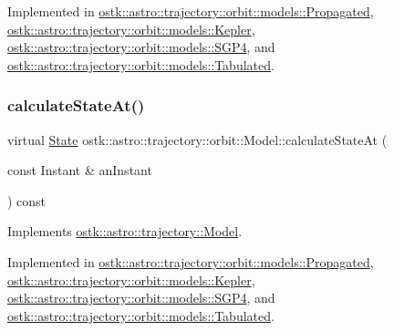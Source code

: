 Implemented in \hyperlink{classostk_1_1astro_1_1trajectory_1_1orbit_1_1models_1_1_propagated_a6360392c65494aa42aadff58ec58e49c}{ostk\+::astro\+::trajectory\+::orbit\+::models\+::\+Propagated}, \hyperlink{classostk_1_1astro_1_1trajectory_1_1orbit_1_1models_1_1_kepler_a312fe4296eadcb00799ce9981b0c4f18}{ostk\+::astro\+::trajectory\+::orbit\+::models\+::\+Kepler}, \hyperlink{classostk_1_1astro_1_1trajectory_1_1orbit_1_1models_1_1_s_g_p4_af14e7851024d96eb20033ca9296dc003}{ostk\+::astro\+::trajectory\+::orbit\+::models\+::\+S\+G\+P4}, and \hyperlink{classostk_1_1astro_1_1trajectory_1_1orbit_1_1models_1_1_tabulated_ad7aabd8943ffaa16e569e331bdfa414e}{ostk\+::astro\+::trajectory\+::orbit\+::models\+::\+Tabulated}.

\mbox{\label{classostk_1_1astro_1_1trajectory_1_1orbit_1_1_model_a34a0d8979ec1f7ade3e434fc0dad3711}} 
\subsubsection{\texorpdfstring{calculate\+State\+At()}{calculateStateAt()}}
{\footnotesize\ttfamily virtual \hyperlink{classostk_1_1astro_1_1trajectory_1_1_state}{State} ostk\+::astro\+::trajectory\+::orbit\+::\+Model\+::calculate\+State\+At (\begin{DoxyParamCaption}\item[{const Instant \&}]{an\+Instant }\end{DoxyParamCaption}) const\hspace{0.3cm}{\ttfamily [pure virtual]}}



Implements \hyperlink{classostk_1_1astro_1_1trajectory_1_1_model_ad25eeaded2946bf73d44161b5f4e9a0e}{ostk\+::astro\+::trajectory\+::\+Model}.



Implemented in \hyperlink{classostk_1_1astro_1_1trajectory_1_1orbit_1_1models_1_1_propagated_a2efc3c1af735dcf2ec622d056fa0a13f}{ostk\+::astro\+::trajectory\+::orbit\+::models\+::\+Propagated}, \hyperlink{classostk_1_1astro_1_1trajectory_1_1orbit_1_1models_1_1_kepler_a4de0c3d7a2b37c1c2ab4d6e207339809}{ostk\+::astro\+::trajectory\+::orbit\+::models\+::\+Kepler}, \hyperlink{classostk_1_1astro_1_1trajectory_1_1orbit_1_1models_1_1_s_g_p4_ad88439d9c46a75d3da8c20d2872271e3}{ostk\+::astro\+::trajectory\+::orbit\+::models\+::\+S\+G\+P4}, and \hyperlink{classostk_1_1astro_1_1trajectory_1_1orbit_1_1models_1_1_tabulated_ad7935cafe71b572b97b9df93e469d2f8}{ostk\+::astro\+::trajectory\+::orbit\+::models\+::\+Tabulated}.

